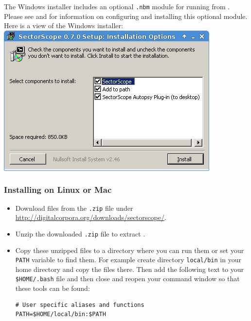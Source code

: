 \documentclass[11pt,fleqn]{article} %
\begin{document}
The Windows installer includes an optional \sscope \aut \verb+.nbm+ module for running \sscope from \aut.  Please see \textbf{} and \textbf{} for information on configuring and installing this optional \sscope module.\\

Here is a view of the \sscope Windows installer:\\
\includegraphics[scale=.4]{screenshots/installer}\\

\subsubsection{Installing on Linux or Mac}
\begin{itemize}
\item Download \sscope files from the \verb+.zip+ file under \url{http://digitalcorpora.org/downloads/sectorscope/}.
\item Unzip  the downloaded \verb+.zip+ file to extract \sscope.
\item Copy these unzipped files to a directory where you can run them or set your \verb+PATH+ variable to find them. For example create directory \verb+local/bin+ in your home directory and copy the files there. Then add the following text to your \verb+$HOME/.bash+ file and then close and reopen your command window so that these tools can be found:

\begingroup
\footnotesize
\begin{Verbatim}[fontfamily=courier]
# User specific aliases and functions
PATH=$HOME/local/bin:$PATH
\end{Verbatim}
\endgroup
\end{itemize}
\end{document}
